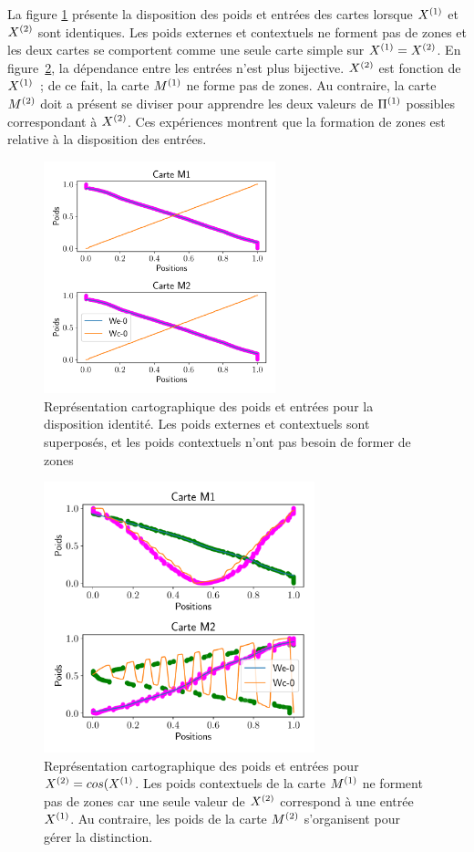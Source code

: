 \documentclass[../main]{subfiles}
\begin{document}
La figure \ref{fig:id_results} présente la disposition des poids et entrées des cartes lorsque $X^{({1})}$ et $X^{({2})}$ sont identiques. Les poids externes et contextuels ne forment pas de zones et les deux cartes se comportent comme une seule carte simple sur $X^{({1})} = X^{({2})}$.
En figure~\ref{fig:cos_results}, la dépendance entre les entrées n'est plus bijective. $X^{({2})}$ est fonction de $X^{({1})}$~; de ce fait, la carte $M^{({1})}$ ne forme pas de zones. Au contraire, la carte $M^{({2})}$ doit a présent se diviser pour apprendre les deux valeurs de $\Pi^{({1})}$ possibles correspondant à $X^{({2})}$. Ces expériences montrent que la formation de zones est relative à la disposition des entrées.

\begin{figure}
	\centering\includegraphics[width=0.6\textwidth]{2som_id_w.pdf}
	\caption{Représentation cartographique des poids et entrées pour la disposition identité. Les poids externes et contextuels sont superposés, et les poids contextuels n'ont pas besoin de former de zones \label{fig:id_results}}
	\end{figure}
	
	\begin{figure}
		\centering\includegraphics[width=0.7\textwidth]{2som_cos_w.pdf}
		\caption{Représentation cartographique des poids et entrées pour $X^{({2})} = cos(X^{({1})}$. Les poids contextuels de la carte $M^{({1})}$ ne forment pas de zones car une seule valeur de $X^{({2})}$ correspond à une entrée $X^{({1})}$. Au contraire, les poids de la carte $M^{({2})}$ s'organisent pour gérer la distinction. \label{fig:cos_results}}
	\end{figure}
\end{document}
